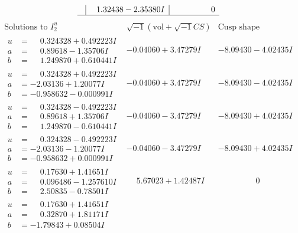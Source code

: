 \documentclass[1p]{elsarticle_modified}
\theoremstyle{definition}
\newcommand{\I}{\sqrt{-1}}
\begin{document}
$$\begin{array}{c|c|c}
 & \phantom{-}1.32438 - 2.35380 I & \phantom{-0.000000 } 0\\
 \hline 
 \end{array}$$\newpage$$\begin{array}{c|c|c}  
\text{Solutions to }I^u_{2}& \I (\text{vol} + \sqrt{-1}CS) & \text{Cusp shape}\\
 \hline 
\begin{aligned}
u &= \phantom{-}0.324328 + 0.492223 I \\
a &= \phantom{-}0.89618 - 1.35706 I \\
b &= \phantom{-}1.249870 + 0.610441 I\end{aligned}
 & -0.04060 + 3.47279 I & -8.09430 - 4.02435 I \\ \hline\begin{aligned}
u &= \phantom{-}0.324328 + 0.492223 I \\
a &= -2.03136 + 1.20077 I \\
b &= -0.958632 - 0.000991 I\end{aligned}
 & -0.04060 + 3.47279 I & -8.09430 - 4.02435 I \\ \hline\begin{aligned}
u &= \phantom{-}0.324328 - 0.492223 I \\
a &= \phantom{-}0.89618 + 1.35706 I \\
b &= \phantom{-}1.249870 - 0.610441 I\end{aligned}
 & -0.04060 - 3.47279 I & -8.09430 + 4.02435 I \\ \hline\begin{aligned}
u &= \phantom{-}0.324328 - 0.492223 I \\
a &= -2.03136 - 1.20077 I \\
b &= -0.958632 + 0.000991 I\end{aligned}
 & -0.04060 - 3.47279 I & -8.09430 + 4.02435 I \\ \hline\begin{aligned}
u &= \phantom{-}0.17630 + 1.41651 I \\
a &= \phantom{-}0.096486 - 1.257610 I \\
b &= \phantom{-}2.50835 - 0.78501 I\end{aligned}
 & \phantom{-}5.67023 + 1.42487 I & \phantom{-0.000000 } 0 \\ \hline\begin{aligned}
u &= \phantom{-}0.17630 + 1.41651 I \\
a &= \phantom{-}0.32870 + 1.81171 I \\
b &= -1.79843 + 0.08504 I\end{aligned}

\end{array}$$
\end{document}
